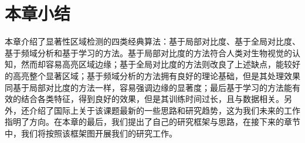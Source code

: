 \section{本章小结}
本章介绍了显著性区域检测的四类经典算法：基于局部对比度、基于全局对比度、基于频域分析和基于学习的方法。基于局部对比度的方法符合人类对生物视觉的认知，然而却容易高亮区域边缘；基于全局对比度的方法则改良了上述缺点，能较好的高亮整个显著区域；基于频域分析的方法拥有良好的理论基础，但是其处理效果同基于局部对比度的方法一样，容易强调边缘的显著度；最后基于学习的方法能有效的结合各类特征，得到良好的效果，但是其训练时间过长，且与数据相关。另外，还介绍了国际上关于该课题最新的一些思路和研究趋势，这为我们未来的工作指明了方向。在本章的最后，我们提出了自己的研究框架与思路，在接下来的章节中，我们将按照该框架图开展我们的研究工作。
